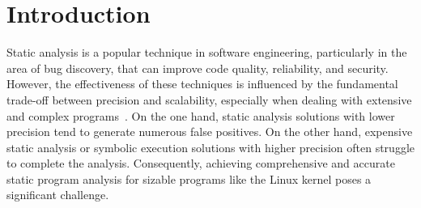 \section{Introduction}


Static analysis is a popular technique in software engineering, particularly in the area of bug discovery, that can improve code quality, reliability, and security.
However, the effectiveness of these techniques is influenced by the fundamental trade-off between precision and scalability, especially when dealing with extensive and complex programs~\cite{DBLP:journals/csur/ParkLR22, gosain_static_2015}.
On the one hand, static analysis solutions with lower precision tend to generate numerous false positives. 
On the other hand, expensive static analysis or symbolic execution solutions with higher precision often struggle to complete the analysis. 
Consequently, achieving comprehensive and accurate static program analysis for sizable programs like the Linux kernel poses a significant challenge.





